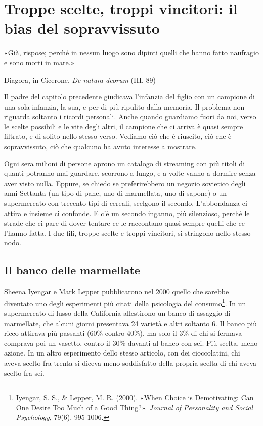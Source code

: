 \chapter{Troppe scelte, troppi vincitori: il bias del sopravvissuto}
\label{cap:p2c30}

\epigraph{«Già, rispose; perché in nessun luogo sono dipinti quelli che hanno fatto naufragio e sono morti in mare.»}{Diagora, in Cicerone, \textit{De natura deorum} (III, 89)}

Il padre del capitolo precedente giudicava l'infanzia del figlio con un campione di una sola infanzia, la sua, e per di più ripulito dalla memoria. Il problema non riguarda soltanto i ricordi personali. Anche quando guardiamo fuori da noi, verso le scelte possibili e le vite degli altri, il campione che ci arriva è quasi sempre filtrato, e di solito nello stesso verso. Vediamo ciò che è riuscito, ciò che è sopravvissuto, ciò che qualcuno ha avuto interesse a mostrare.

Ogni sera milioni di persone aprono un catalogo di streaming con più titoli di quanti potranno mai guardare, scorrono a lungo, e a volte vanno a dormire senza aver visto nulla. Eppure, se chiedo se preferirebbero un negozio sovietico degli anni Settanta (un tipo di pane, uno di marmellata, uno di sapone) o un supermercato con trecento tipi di cereali, scelgono il secondo. L'abbondanza ci attira e insieme ci confonde. E c'è un secondo inganno, più silenzioso, perché le strade che ci pare di dover tentare ce le raccontano quasi sempre quelli che ce l'hanno fatta. I due fili, troppe scelte e troppi vincitori, si stringono nello stesso nodo.

\section{Il banco delle marmellate}
\label{sec:p2c30-marmellate}

Sheena Iyengar e Mark Lepper pubblicarono nel 2000 quello che sarebbe diventato uno degli esperimenti più citati della psicologia del consumo\footnote{Iyengar, S. S., \& Lepper, M. R. (2000). «When Choice is Demotivating: Can One Desire Too Much of a Good Thing?». \textit{Journal of Personality and Social Psychology}, 79(6), 995-1006.}. In un supermercato di lusso della California allestirono un banco di assaggio di marmellate, che alcuni giorni presentava 24 varietà e altri soltanto 6. Il banco più ricco attirava più passanti (60\% contro 40\%), ma solo il 3\% di chi si fermava comprava poi un vasetto, contro il 30\% davanti al banco con sei. Più scelta, meno azione. In un altro esperimento dello stesso articolo, con dei cioccolatini, chi aveva scelto fra trenta si diceva meno soddisfatto della propria scelta di chi aveva scelto fra sei.


